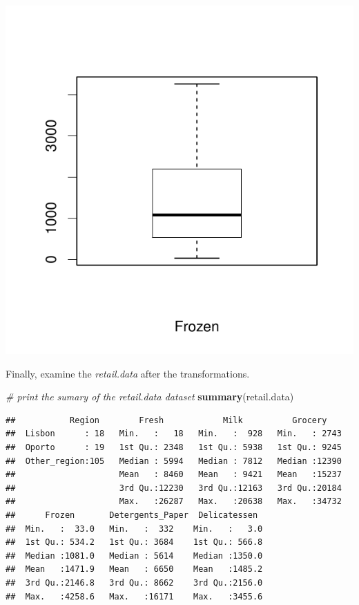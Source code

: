 \documentclass[]{article}
\newenvironment{Shaded}{\begin{snugshade}}{\end{snugshade}}
\newcommand{\KeywordTok}[1]{\textcolor[rgb]{0.13,0.29,0.53}{\textbf{#1}}}
\newcommand{\CommentTok}[1]{\textcolor[rgb]{0.56,0.35,0.01}{\textit{#1}}}
\newcommand{\NormalTok}[1]{#1}
\begin{document}
\begin{center}\includegraphics{7._K-means_Clustering_files/figure-latex/unnamed-chunk-18-1} \end{center}

Finally, examine the \emph{retail.data} after the transformations.

\begin{Shaded}
\begin{Highlighting}[]
\CommentTok{# print the sumary of the retail.data dataset}
\KeywordTok{summary}\NormalTok{(retail.data)}
\end{Highlighting}
\end{Shaded}

\begin{verbatim}
##           Region        Fresh            Milk          Grocery     
##  Lisbon      : 18   Min.   :   18   Min.   :  928   Min.   : 2743  
##  Oporto      : 19   1st Qu.: 2348   1st Qu.: 5938   1st Qu.: 9245  
##  Other_region:105   Median : 5994   Median : 7812   Median :12390  
##                     Mean   : 8460   Mean   : 9421   Mean   :15237  
##                     3rd Qu.:12230   3rd Qu.:12163   3rd Qu.:20184  
##                     Max.   :26287   Max.   :20638   Max.   :34732  
##      Frozen       Detergents_Paper  Delicatessen   
##  Min.   :  33.0   Min.   :  332    Min.   :   3.0  
##  1st Qu.: 534.2   1st Qu.: 3684    1st Qu.: 566.8  
##  Median :1081.0   Median : 5614    Median :1350.0  
##  Mean   :1471.9   Mean   : 6650    Mean   :1485.2  
##  3rd Qu.:2146.8   3rd Qu.: 8662    3rd Qu.:2156.0  
##  Max.   :4258.6   Max.   :16171    Max.   :3455.6
\end{verbatim}
\end{document}
